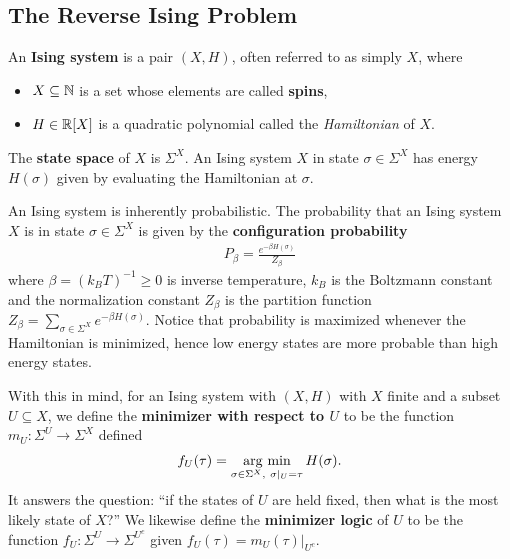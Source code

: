 \documentclass{article}
\begin{document}
\subsection{The Reverse Ising Problem}

\begin{defn}\label{defn:ising-system}
  An \textbf{Ising system} is a pair $(X, H)$, often referred to as simply $X$, where
  \begin{itemize}
    \item $X \subseteq \mathbb{N}$ is a set whose elements are called \textbf{spins},
    \item $H \in \mathbb{R}[X]$ is a quadratic polynomial called the \emph{Hamiltonian} of $X$.
  \end{itemize}
  The \textbf{state space} of $X$ is $\Sigma^X$. An Ising system $X$ in state $\sigma \in \Sigma^X$ has energy $H(\sigma)$ given by evaluating the Hamiltonian at $\sigma$.
\end{defn}

An Ising system is inherently probabilistic. The probability that an Ising system $X$ is in state $\sigma \in \Sigma^X$ is given by the \textbf{configuration probability}
\begin{align*}
  P_\beta = \frac{e^{-\beta H(\sigma)}}{Z_\beta}
\end{align*}
where $\beta = (k_BT)^{-1} \geq 0$ is inverse temperature, $k_B$ is the Boltzmann constant and the normalization constant $Z_\beta$ is the partition function $Z_\beta = \sum_{\sigma \in \Sigma^X} e^{-\beta H(\sigma)}$. Notice that probability is maximized whenever the Hamiltonian is minimized, hence low energy states are more probable than high energy states.

With this in mind, for an Ising system with $(X,H)$ with $X$ finite and a subset $U \subseteq X$, we define the \textbf{minimizer with respect to $U$} to be the function $m_U: \Sigma^U \to \Sigma^{X}$ defined
\begin{align*}
f_U(\tau) = \operatorname*{arg ~ min}_{\sigma \in \Sigma^X, ~\sigma|_U = \tau} H(\sigma).
\end{align*}
It answers the question: ``if the states of $U$ are held fixed, then what is the most likely state of $X$?'' We likewise define the \textbf{minimizer logic} of $U$ to be the function $f_U:\Sigma^U \to \Sigma^{U^c}$ given $f_U(\tau) = m_U(\tau)|_{U^c}$.

\bigskip
\end{document}
